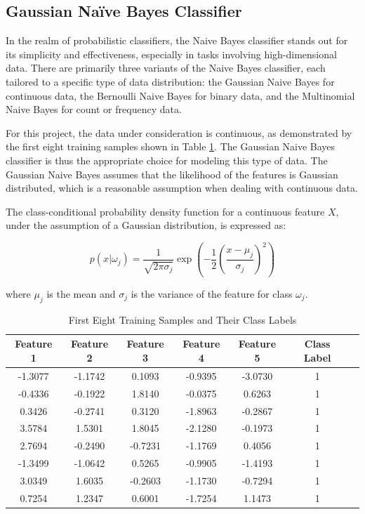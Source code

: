 \documentclass[12pt, onecolumn]{article}
\begin{document}
\subsection{Gaussian Naïve Bayes Classifier}

In the realm of probabilistic classifiers, the Naive Bayes classifier stands out for its simplicity and effectiveness, especially in tasks involving high-dimensional data. There are primarily three variants of the Naive Bayes classifier, each tailored to a specific type of data distribution: the Gaussian Naive Bayes for continuous data, the Bernoulli Naive Bayes for binary data, and the Multinomial Naive Bayes for count or frequency data.

For this project, the data under consideration is continuous, as demonstrated by the first eight training samples shown in Table \ref{tab:training_samples}. The Gaussian Naive Bayes classifier is thus the appropriate choice for modeling this type of data. The Gaussian Naive Bayes assumes that the likelihood of the features is Gaussian distributed, which is a reasonable assumption when dealing with continuous data.

The class-conditional probability density function for a continuous feature  \( X \), under the assumption of a Gaussian distribution, is expressed as:

\[
p(x|\omega_j) = \frac{1}{\sqrt{2\pi\sigma_j}} \exp \left(-\frac{1}{2} \left(\frac{x - \mu_j}{\sigma_j}\right)^2\right)
\]

where \( \mu_j \) is the mean and \( \sigma_j \) is the variance of the feature for class \( \omega_j \).



\begin{table}[htbp]
\centering
\caption{First Eight Training Samples and Their Class Labels}
\begin{tabular}{ccccccc}
\hline
Feature 1 & Feature 2 & Feature 3 & Feature 4 & Feature 5  & Class Label \\
\hline
-1.3077 & -1.1742 & 0.1093 & -0.9395 & -3.0730  & 1 \\
-0.4336 & -0.1922 & 1.8140 & -0.0375 & 0.6263  & 1 \\
0.3426 & -0.2741 & 0.3120 & -1.8963 & -0.2867  & 1 \\
3.5784 & 1.5301 & 1.8045 & -2.1280 & -0.1973  & 1 \\
2.7694 & -0.2490 & -0.7231 & -1.1769 & 0.4056  & 1 \\
-1.3499 & -1.0642 & 0.5265 & -0.9905 & -1.4193 & 1 \\
3.0349 & 1.6035 & -0.2603 & -1.1730 & -0.7294 & 1 \\
0.7254 & 1.2347 & 0.6001 & -1.7254 & 1.1473 &  1 \\
\hline
\end{tabular}
\label{tab:training_samples}
\end{table}
\end{document}
